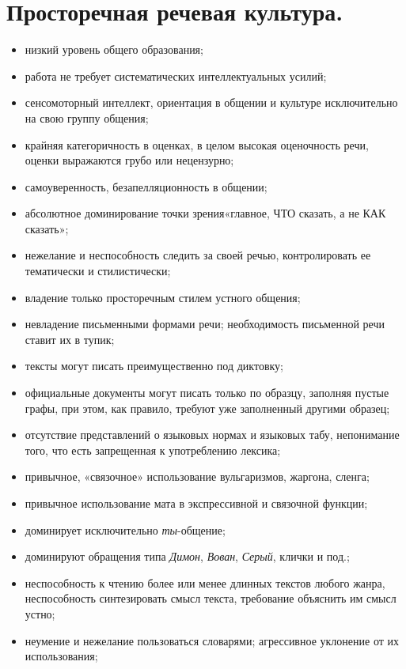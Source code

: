 \section{Просторечная речевая культура.}

\begin{itemize}
    \item низкий уровень общего образования;
    \item работа не требует систематических интеллектуальных усилий;
    \item сенсомоторный интеллект, ориентация в общении и культуре исключительно на свою группу общения;
    \item крайняя категоричность в оценках, в целом высокая оценочность речи, оценки выражаются грубо или нецензурно;
    \item самоуверенность, безапелляционность в общении;
    \item абсолютное доминирование точки зрения«главное, ЧТО сказать, а не КАК сказать»;
    \item нежелание и неспособность следить за своей речью, контролировать ее тематически и стилистически;
    \item владение только просторечным стилем устного общения;
    \item невладение письменными формами речи; необходимость письменной речи ставит их в тупик;
    \item тексты могут писать преимущественно под диктовку;
    \item официальные документы могут писать только по образцу, заполняя пустые графы, при этом, как правило, требуют уже заполненный другими образец;
    \item отсутствие представлений о языковых нормах и языковых табу, непонимание того, что есть запрещенная к употреблению лексика;
    \item привычное, «связочное» использование вульгаризмов, жаргона, сленга;
    \item привычное использование мата в экспрессивной и связочной функции;
    \item доминирует исключительно \textit{ты}-общение;
    \item доминируют обращения типа \textit{Димон}, \textit{Вован}, \textit{Серый}, клички и под.;
    \item неспособность к чтению более или менее длинных текстов любого жанра, неспособность синтезировать смысл текста, требование объяснить им смысл устно;
    \item неумение и нежелание пользоваться словарями; агрессивное уклонение от их использования;

\end{itemize}
